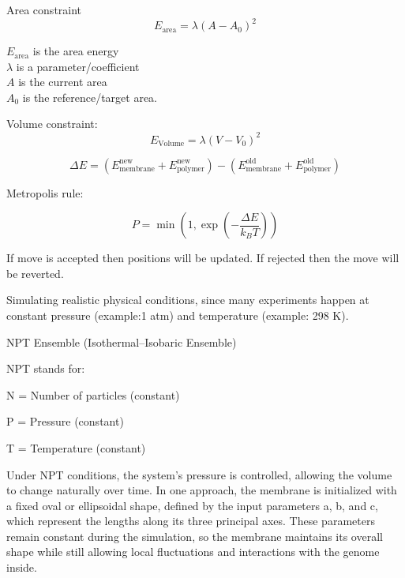 \documentclass[12pt]{article}
\begin{document}
\begin{flushleft}
Area constraint
\begin{equation}
E_{\text{area}} = \lambda(A - A_0)^2
\end{equation}

$E_{\text{area}}$ is the area energy\\
$\lambda$ is a parameter/coefficient\\
$A$ is the current area\\
$A_0$ is the reference/target area.



Volume constraint:
\begin{equation}
E_{\text{Volume}} = \lambda(V - V_0)^2
\end{equation}



\begin{equation}
\Delta E = (E_{\text{membrane}}^{\text{new}} + E_{\text{polymer}}^{\text{new}}) - (E_{\text{membrane}}^{\text{old}} + E_{\text{polymer}}^{\text{old}})
\end{equation}


Metropolis rule:

\begin{equation}
P = \min\left(1, \exp\left(-\frac{\Delta E}{k_B T}\right)\right)
\end{equation}

If move is accepted then positions will be updated. If rejected then the move will be reverted.

Simulating realistic physical conditions, since many experiments happen at constant pressure (example:1 atm) and temperature  (example: 298 K).

\noindent NPT Ensemble (Isothermal–Isobaric Ensemble)

NPT stands for:

    N = Number of particles (constant)

    P = Pressure (constant)

    T = Temperature (constant)
    
    Under NPT conditions, the system’s pressure is controlled, allowing the volume to change naturally over time. In one approach, the membrane is initialized with a fixed oval or ellipsoidal shape, defined by the input parameters a, b, and c, which represent the lengths along its three principal axes. These parameters remain constant during the simulation, so the membrane maintains its overall shape while still allowing local fluctuations and interactions with the genome inside.


\end{flushleft}
\end{document}
